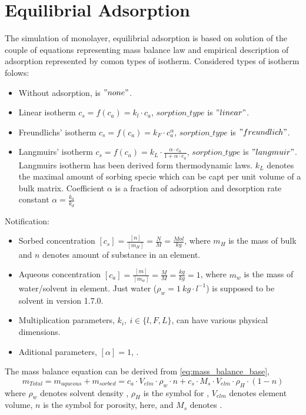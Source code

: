 \section{Equilibrial Adsorption}\label{sec:sorp_math}
The simulation of monolayer, equilibrial adsorption is based on solution of the couple of equations representing mass balance law and empirical description of adsorption represented by comon types of isotherm. Considered types of isotherm folows:
\begin{itemize}
 \item Without adsorption,  is $"none"$.
 \item Linear isotherm $c_s = f(c_a) = k_l\cdot c_a$, $sorption\_type$ is $"linear"$.
 \item Freundlichs' isotherm $c_s = f(c_a) = k_F\cdot c_a^{\alpha}$, $sorption\_type$ is $"freundlich"$.
 \item Langmuirs' isotherm $c_s = f(c_a) = k_L\cdot \frac{\alpha\cdot c_a}{1 + \alpha\cdot c_a}$, $sorption\_type$ is $"langmuir"$. Langmuirs isotherm has been derived form thermodynamic laws. $k_L$ denotes the maximal amount of sorbing specie which can be capt per unit volume of a bulk matrix. Coefficient $\alpha$ is a fraction of adsorption and desorption rate constant $\alpha = \frac{k_a}{k_d}$
\end{itemize}
Notification:
\begin{itemize}
 \item Sorbed concentration $[c_s] = \frac{[n]}{[m_H]} = \frac{N}{M} = \frac{Mol}{kg}$, where $m_H$ is the mass of bulk and $n$ denotes amount of substance in an element.
 \item Aqueous concentration $[c_a] = \frac{[m]}{[m_w]} = \frac{M}{M} = \frac{kg}{kg} = 1$, where $m_w$ is the mass of water/solvent in element. Just water ($\rho_w = 1~kg\cdot l^{-1}$) is supposed to be solvent in version 1.7.0. 
 \item Multiplication parameters, $k_i, ~i\in\{ l,F,L\}$,  can have various physical dimensions.
 \item Aditional parameters, $[\alpha] = 1$, .
\end{itemize}
The mass balance equation can be derived from \ref{eq:mass_balance_base},
\begin{equation}
  m_{Total} = m_{aqueous} + m_{sorbed} = c_a\cdot V_{elm}\cdot\rho_w\cdot n + c_s\cdot M_s \cdot V_{elm}\cdot\rho_H\cdot(1-n)
  \label{eq:mass_balance_base}
\end{equation}
where $\rho_w$ denotes solvent density , $\rho_H$ is the symbol for , $V_{elm}$ denotes element volume, $n$ is the symbol for porosity, here, and $M_s$ denotes .

